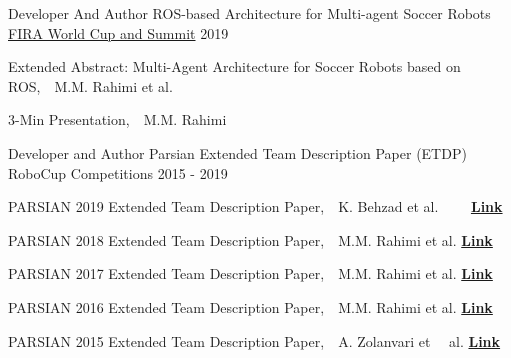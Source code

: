 

\begin{cventries}
  \cventry
    {Developer And Author} %
    {ROS-based Architecture for Multi-agent Soccer Robots} %
    {\href{https://easychair.org/cfp/fira2019}{FIRA World Cup and Summit}} %
    {2019} %
    {
      \begin{cvitems} %
        \item {Extended Abstract: Multi-Agent Architecture for Soccer Robots based on ROS,~~M.M. Rahimi et al.~~~~ }
        \item {3-Min Presentation,~~M.M. Rahimi~~~~ }
      \end{cvitems}
    }


  \cventry
    {Developer and Author} %
    {Parsian Extended Team Description Paper (ETDP)} %
    {RoboCup Competitions} %
    {2015 - 2019} %
    {
      \begin{cvitems} %
        \item {PARSIAN 2019 Extended Team Description Paper,~~K. Behzad et al.~~~~ \href{https://ssl.robocup.org/wp-content/uploads/2019/01/2019_ETDP_Parsian.pdf}{\textbf{Link}}}
        \item {PARSIAN 2018 Extended Team Description Paper,~~M.M. Rahimi et al. \href{http://wiki.robocup.org/images/7/75/Robocupssl2018-paper32.pdf}{\textbf{Link}}}
        \item {PARSIAN 2017 Extended Team Description Paper,~~M.M. Rahimi et al. \href{https://www.robocup2017.org/file/symposium/soccer_sml_size/Robocupssl2017-final14.pdf}{\textbf{Link}}}
        \item {PARSIAN 2016 Extended Team Description Paper,~~M.M. Rahimi et al. \href{https://ssl.robocup.org/wp-content/uploads/2019/01/2016_ETDP_Parsian.pdf}{\textbf{Link}}}
        \item {PARSIAN 2015 Extended Team Description Paper,~~A. Zolanvari et~~ al. \href{https://ssl.robocup.org/wp-content/uploads/2019/01/2015_TDP_Parsian.pdf}{\textbf{Link}}}
      \end{cvitems}
    }
  

\end{cventries}
